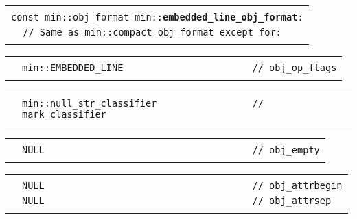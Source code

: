 \documentclass[12pt]{article}
\makeatletter
\newcommand{\TT}[1]{{\tt \bfseries #1}}
\newcommand{\ttindex}[1]{\index{#1@{\tt #1}}}
\newenvironment{indpar}[1][0.3in]%
	{\begin{list}{}%
		     {\setlength{\itemsep}{0in}%
		      \setlength{\topsep}{0in}%
		      \setlength{\parsep}{1ex}%
		      \setlength{\labelwidth}{#1}%
		      \setlength{\leftmargin}{#1}%
		      \addtolength{\leftmargin}{\labelsep}}%
	 \item}%
	{\end{list}}
\newcommand{\LABEL}[1]{\label{#1}}
\newlength{\ARGBREAKLENGTH}
\newcommand{\ARGBREAK}[1][\ARGBREAKLENGTH]{\\&\hspace*{#1}}
\newcommand{\MINKEY}[1]%
	   {\TT{#1}\ttindex{min::#1}\ttindex{#1}}
\makeatother
\begin{document}
\begin{indpar}[1em]

\begin{tabular}{r@{}l}\hspace*{0.1in} \\[-3ex]
\multicolumn{2}{l}{\tt const min::obj\_format
                   min::\MINKEY{embedded\_line\_obj\_format}:}%
\LABEL{MIN::EMBEDDED_LINE_OBJ_FORMAT}\ARGBREAK
\verb|// Same as min::compact_obj_format except for:|\ARGBREAK
\end{tabular}

\vspace{-4ex}\begin{tabular}{r@{}l}\hspace*{0.1in}\ARGBREAK
\verb|min::EMBEDDED_LINE                       // obj_op_flags|\ARGBREAK
\end{tabular}

\vspace{-4ex}\begin{tabular}{r@{}l}\hspace*{0.1in}\ARGBREAK
\verb|min::null_str_classifier                 // mark_classifier|\ARGBREAK
\end{tabular}

\vspace{-4ex}\begin{tabular}{r@{}l}\hspace*{0.1in}\ARGBREAK
\verb|NULL                                     // obj_empty|\ARGBREAK
\end{tabular}

\vspace{-4ex}\begin{tabular}{r@{}l}\hspace*{0.1in}\ARGBREAK
\verb|NULL                                     // obj_attrbegin|\ARGBREAK
\verb|NULL                                     // obj_attrsep|\ARGBREAK
\end{tabular}

\end{indpar}
\end{document}
